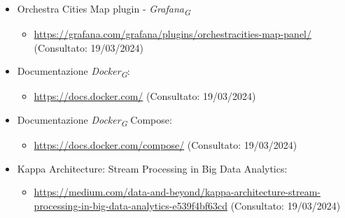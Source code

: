 \begin{itemize}
\begin{itemize}
    \end{itemize}
    \item  Orchestra Cities Map plugin - \textit{Grafana}\textsubscript{\textit{G}} 
    \begin{itemize}
        \item \url{https://grafana.com/grafana/plugins/orchestracities-map-panel/} (Consultato: 19/03/2024)
    \end{itemize}
    \item Documentazione \textit{Docker}\textsubscript{\textit{G}}: 
    \begin{itemize}
        \item \url{https://docs.docker.com/} (Consultato: 19/03/2024)
    \end{itemize}
    \item Documentazione \textit{Docker}\textsubscript{\textit{G}} Compose: 
    \begin{itemize}
        \item \url{https://docs.docker.com/compose/} (Consultato: 19/03/2024)
    \end{itemize}
    \item Kappa Architecture: Stream Processing in Big Data Analytics: 
    \begin{itemize}
        \item \url{https://medium.com/data-and-beyond/kappa-architecture-stream-processing-in-big-data-analytics-e539f4bf63cd} (Consultato: 19/03/2024)
    \end{itemize}
\end{itemize}
